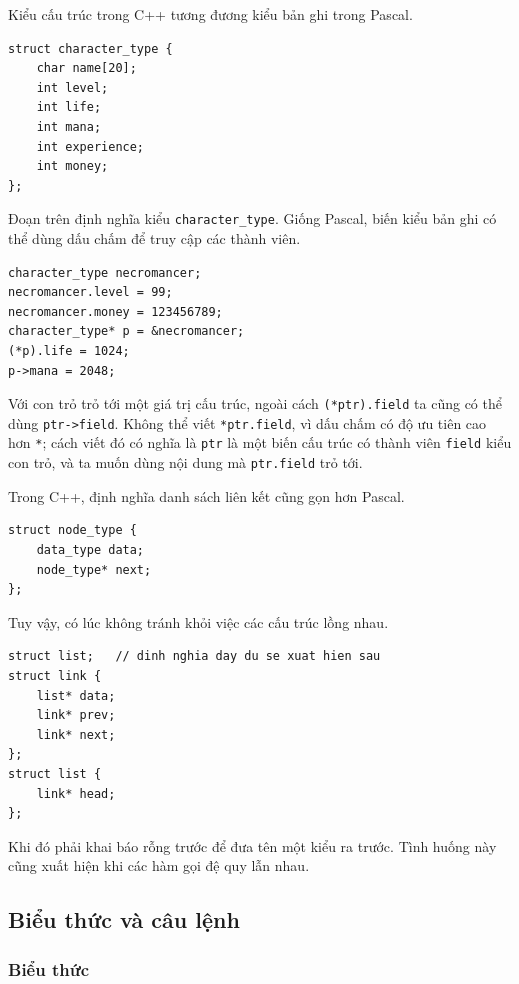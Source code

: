 \documentclass[11pt]{article}
\newcommand{\cpp}{C++}
\newcommand{\pascal}{Pascal}
\begin{document}
Kiểu cấu trúc trong \cpp{} tương đương kiểu bản ghi trong \pascal{}.

\begin{verbatim}
struct character_type {
    char name[20];
    int level;
    int life;
    int mana;
    int experience;
    int money;
};
\end{verbatim}

Đoạn trên định nghĩa kiểu \verb|character_type|. Giống \pascal{}, biến kiểu
bản ghi có thể dùng dấu chấm để truy cập các thành viên.

\begin{verbatim}
character_type necromancer;
necromancer.level = 99;
necromancer.money = 123456789;
character_type* p = &necromancer;
(*p).life = 1024;
p->mana = 2048;
\end{verbatim}

Với con trỏ trỏ tới một giá trị cấu trúc, ngoài cách \verb|(*ptr).field| ta
cũng có thể dùng \verb|ptr->field|. Không thể viết \verb|*ptr.field|, vì dấu
chấm có độ ưu tiên cao hơn \verb|*|; cách viết đó có nghĩa là \verb|ptr| là
một biến cấu trúc có thành viên \verb|field| kiểu con trỏ, và ta muốn dùng nội
dung mà \verb|ptr.field| trỏ tới.

Trong \cpp{}, định nghĩa danh sách liên kết cũng gọn hơn \pascal{}.

\begin{verbatim}
struct node_type {
    data_type data;
    node_type* next;
};
\end{verbatim}

Tuy vậy, có lúc không tránh khỏi việc các cấu trúc lồng nhau.

\begin{verbatim}
struct list;   // dinh nghia day du se xuat hien sau
struct link {
    list* data;
    link* prev;
    link* next;
};
struct list {
    link* head;
};
\end{verbatim}

Khi đó phải khai báo rỗng trước để đưa tên một kiểu ra trước. Tình huống này
cũng xuất hiện khi các hàm gọi đệ quy lẫn nhau.

\subsection{Biểu thức và câu lệnh}

\subsubsection*{Biểu thức}
\end{document}
